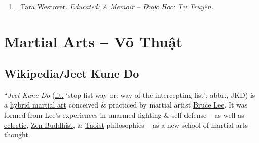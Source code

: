 \documentclass{article}
\begin{document}
\begin{enumerate}
\begin{itemize}
		\item ``Whether narrating scenes of fury \& violence or evoking rural landscapes or tortured self-analysis, {\sc Westover} writes with uncommon intelligence \& grace $\ldots$ 1 of the most improbable \& fascinating journeys I've read in recent years.'' -- {\sc Newsday}
	\end{itemize}
	{\sf Author the Author.} {\sc Tara Westover} s an American historian \& memoirist. Her first book, Educated, debuted at \#1 on the New York Times bestseller list \& remained on the list, in hardcover, for more than two years. The book, a memoir of her upbringing in rural Idaho, was a finalist for a number of national awards, including the Los Angeles Times Book Prize, the PEN{\tt/}Jean Stein Book Award, \& the National Book Critics Circle Award. To date it has been translated into more than 45 languages. The New York Times named Educated one of the 10 Best Books of 2018, \& the American Booksellers Association voted Educated the Nonfiction Book of the Year. For her staggering impact, Time named Westover one of the 100 Most Influential People of 2019. Westover holds a PhD in intellectual history from Trinity College, Cambridge, \& in 2019 she was the Rosenthal Writer in Residence at Harvard University. In 2023, she was awarded the National Humanities Medal by President Biden.	
	
	\item \cite{Westover_educated}. {\sc Tara Westover}. {\it Educated: A Memoir -- Được Học: Tự Truyện.}\hfill{\sf[done]}
\end{enumerate}


\section{Martial Arts -- Võ Thuật}

\subsection{Wikipedia{\tt/}Jeet Kune Do}
``{\it Jeet Kune Do} (\href{https://en.wikipedia.org/wiki/Literal_translation}{lit.} `stop fist way or: way of the intercepting fist'; abbr., JKD) is a \href{https://en.wikipedia.org/wiki/Hybrid_martial_arts}{hybrid martial art} conceived \& practiced by martial artist \href{https://en.wikipedia.org/wiki/Bruce_Lee}{\sc Bruce Lee}. It was formed from {\sc Lee}'s experiences in unarmed fighting \& self-defense -- as well as \href{https://en.wikipedia.org/wiki/Eclecticism}{eclectic}, \href{https://en.wikipedia.org/wiki/Zen_Buddhism}{Zen Buddhist}, \& \href{https://en.wikipedia.org/wiki/Taoism}{Taoist} philosophies -- as a new school of martial arts thought.
\end{document}
